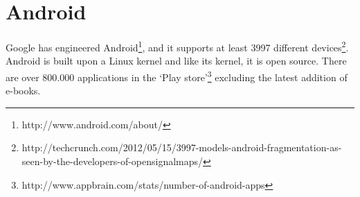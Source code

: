 \section{Android}
Google has engineered Android\footnote{http://www.android.com/about/}, and it supports at least 3997 different devices\footnote{http://techcrunch.com/2012/05/15/3997-models-android-fragmentation-as-seen-by-the-developers-of-opensignalmaps/}. Android is built upon a Linux kernel and like its kernel, it is open source. There are over 800.000 applications in the `Play store'\footnote{http://www.appbrain.com/stats/number-of-android-apps} excluding the latest addition of e-books.